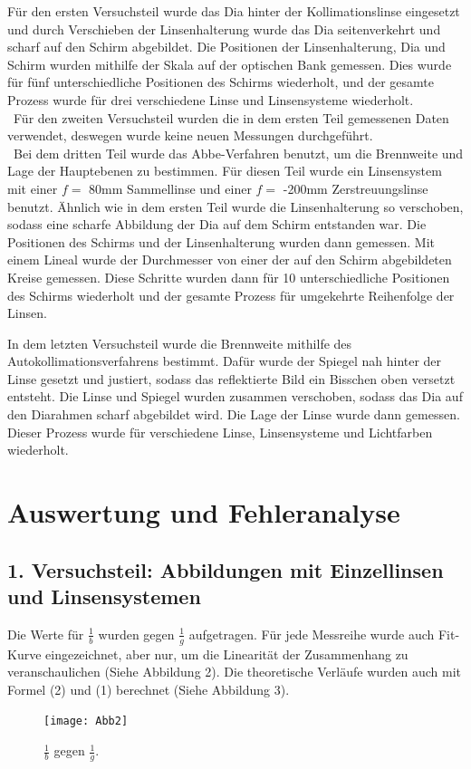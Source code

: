\documentclass[11pt,a4paper]{article}
\begin{document}
Für den ersten Versuchsteil wurde das Dia hinter der Kollimationslinse eingesetzt und durch Verschieben der Linsenhalterung wurde das Dia seitenverkehrt und scharf auf den Schirm abgebildet.
Die Positionen der Linsenhalterung, Dia und Schirm wurden mithilfe der Skala auf der optischen Bank gemessen. Dies wurde für fünf unterschiedliche Positionen des Schirms wiederholt, und der gesamte Prozess wurde für drei verschiedene Linse und Linsensysteme wiederholt. 
\\\
Für den zweiten Versuchsteil wurden die in dem ersten Teil gemessenen Daten verwendet, deswegen wurde keine neuen Messungen durchgeführt. 
\\\
Bei dem dritten Teil wurde das Abbe-Verfahren benutzt, um die Brennweite und Lage der Hauptebenen zu bestimmen. Für diesen Teil wurde ein Linsensystem mit einer $f=$ 80mm Sammellinse und einer $f=$ -200mm Zerstreuungslinse benutzt. Ähnlich wie in dem ersten Teil wurde die Linsenhalterung so verschoben, sodass eine scharfe Abbildung der Dia auf dem Schirm entstanden war. Die Positionen des Schirms und der Linsenhalterung wurden dann gemessen. Mit einem Lineal wurde der Durchmesser von einer der auf den Schirm abgebildeten Kreise gemessen. Diese Schritte wurden dann für 10 unterschiedliche Positionen des Schirms wiederholt und der gesamte Prozess für umgekehrte Reihenfolge der Linsen. 

In dem letzten Versuchsteil wurde die Brennweite mithilfe des Autokollimationsverfahrens bestimmt. Dafür wurde der Spiegel nah hinter der Linse gesetzt und justiert, sodass das reflektierte Bild ein Bisschen oben versetzt entsteht. Die Linse und Spiegel wurden zusammen verschoben, sodass das Dia auf den Diarahmen scharf abgebildet wird. Die Lage der Linse wurde dann gemessen. Dieser Prozess wurde für verschiedene Linse, Linsensysteme und Lichtfarben wiederholt.

\section{Auswertung und Fehleranalyse}
\subsection{1. Versuchsteil: Abbildungen mit Einzellinsen und Linsensystemen}
Die Werte für $\frac{1}{b}$ wurden gegen $\frac{1}{g}$ aufgetragen. Für jede Messreihe wurde auch Fit-Kurve eingezeichnet, aber nur, um die Linearität der Zusammenhang zu veranschaulichen (Siehe Abbildung 2). Die theoretische Verläufe wurden auch mit Formel (2) und (1) berechnet (Siehe Abbildung 3). 
\begin{figure}
	\centering
	\texttt{[image: Abb2]}
	\caption{$\frac{1}{b}$ gegen $\frac{1}{g}$.}
\end{figure} 
\end{document}

